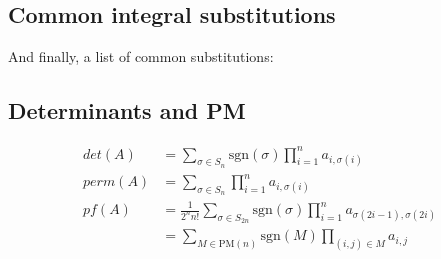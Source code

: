   \subsection{Common integral substitutions} And finally, a list of common substitutions:

      \subsection{Determinants and PM}
                \begin{align*}
                    det(A) &= \sum_{\sigma \in S_n}\text{sgn}(\sigma)\prod_{i = 1}^n a_{i,\sigma(i)}\\
                    perm(A) &= \sum_{\sigma \in S_n} \prod_{i = 1}^n a_{i,\sigma(i)}\\
                    pf(A) &= \frac{1}{2^nn!}\sum_{\sigma \in S_{2n}} \text{sgn}(\sigma)\prod_{i = 1}^n a_{\sigma(2i-1),\sigma(2i)}\\ &= \sum_{M \in \text{PM}(n)} \text{sgn}(M) \prod_{(i,j) \in M} a_{i,j}
                \end{align*}